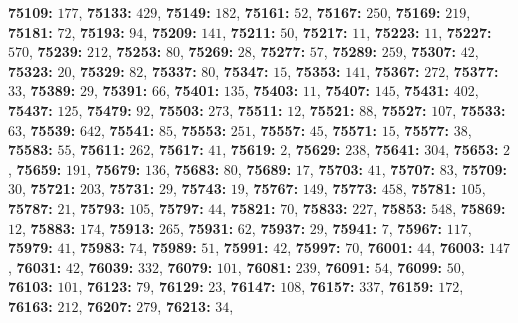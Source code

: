 \textsf{\bfseries 75109:} $177$, \textsf{\bfseries 75133:} $429$, \textsf{\bfseries 75149:} $182$, \textsf{\bfseries 75161:} $52$, \textsf{\bfseries 75167:} $250$, \textsf{\bfseries 75169:} $219$, \textsf{\bfseries 75181:} $72$, \textsf{\bfseries 75193:} $94$, \textsf{\bfseries 75209:} $141$, \textsf{\bfseries 75211:} $50$, \textsf{\bfseries 75217:} $11$, \textsf{\bfseries 75223:} $11$, \textsf{\bfseries 75227:} $570$, \textsf{\bfseries 75239:} $212$, \textsf{\bfseries 75253:} $80$, \textsf{\bfseries 75269:} $28$, \textsf{\bfseries 75277:} $57$, \textsf{\bfseries 75289:} $259$, \textsf{\bfseries 75307:} $42$, \textsf{\bfseries 75323:} $20$, \textsf{\bfseries 75329:} $82$, \textsf{\bfseries 75337:} $80$, \textsf{\bfseries 75347:} $15$, \textsf{\bfseries 75353:} $141$, \textsf{\bfseries 75367:} $272$, \textsf{\bfseries 75377:} $33$, \textsf{\bfseries 75389:} $29$, \textsf{\bfseries 75391:} $66$, \textsf{\bfseries 75401:} $135$, \textsf{\bfseries 75403:} $11$, \textsf{\bfseries 75407:} $145$, \textsf{\bfseries 75431:} $402$, \textsf{\bfseries 75437:} $125$, \textsf{\bfseries 75479:} $92$, \textsf{\bfseries 75503:} $273$, \textsf{\bfseries 75511:} $12$, \textsf{\bfseries 75521:} $88$, \textsf{\bfseries 75527:} $107$, \textsf{\bfseries 75533:} $63$, \textsf{\bfseries 75539:} $642$, \textsf{\bfseries 75541:} $85$, \textsf{\bfseries 75553:} $251$, \textsf{\bfseries 75557:} $45$, \textsf{\bfseries 75571:} $15$, \textsf{\bfseries 75577:} $38$, \textsf{\bfseries 75583:} $55$, \textsf{\bfseries 75611:} $262$, \textsf{\bfseries 75617:} $41$, \textsf{\bfseries 75619:} $2$, \textsf{\bfseries 75629:} $238$, \textsf{\bfseries 75641:} $304$, \textsf{\bfseries 75653:} $2$, \textsf{\bfseries 75659:} $191$, \textsf{\bfseries 75679:} $136$, \textsf{\bfseries 75683:} $80$, \textsf{\bfseries 75689:} $17$, \textsf{\bfseries 75703:} $41$, \textsf{\bfseries 75707:} $83$, \textsf{\bfseries 75709:} $30$, \textsf{\bfseries 75721:} $203$, \textsf{\bfseries 75731:} $29$, \textsf{\bfseries 75743:} $19$, \textsf{\bfseries 75767:} $149$, \textsf{\bfseries 75773:} $458$, \textsf{\bfseries 75781:} $105$, \textsf{\bfseries 75787:} $21$, \textsf{\bfseries 75793:} $105$, \textsf{\bfseries 75797:} $44$, \textsf{\bfseries 75821:} $70$, \textsf{\bfseries 75833:} $227$, \textsf{\bfseries 75853:} $548$, \textsf{\bfseries 75869:} $12$, \textsf{\bfseries 75883:} $174$, \textsf{\bfseries 75913:} $265$, \textsf{\bfseries 75931:} $62$, \textsf{\bfseries 75937:} $29$, \textsf{\bfseries 75941:} $7$, \textsf{\bfseries 75967:} $117$, \textsf{\bfseries 75979:} $41$, \textsf{\bfseries 75983:} $74$, \textsf{\bfseries 75989:} $51$, \textsf{\bfseries 75991:} $42$, \textsf{\bfseries 75997:} $70$, \textsf{\bfseries 76001:} $44$, \textsf{\bfseries 76003:} $147$, \textsf{\bfseries 76031:} $42$, \textsf{\bfseries 76039:} $332$, \textsf{\bfseries 76079:} $101$, \textsf{\bfseries 76081:} $239$, \textsf{\bfseries 76091:} $54$, \textsf{\bfseries 76099:} $50$, \textsf{\bfseries 76103:} $101$, \textsf{\bfseries 76123:} $79$, \textsf{\bfseries 76129:} $23$, \textsf{\bfseries 76147:} $108$, \textsf{\bfseries 76157:} $337$, \textsf{\bfseries 76159:} $172$, \textsf{\bfseries 76163:} $212$, \textsf{\bfseries 76207:} $279$, \textsf{\bfseries 76213:} $34$, 
